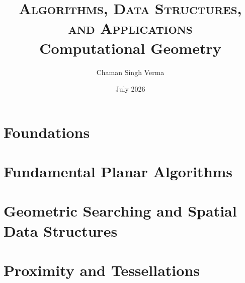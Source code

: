 \documentclass[11pt,a4paper,twoside]{book}
\title{%
  \textsc{Algorithms, Data Structures, and Applications}\\[6pt]
  \large Computational Geometry%
}
\author{%
  Chaman Singh Verma%
}
\date{July 2026}
\begin{document}
\frontmatter
\maketitle


\setcounter{tocdepth}{1}
\tableofcontents
\listofalgorithms
\listoffigures

\mainmatter

\part{Foundations}




\part{Fundamental Planar Algorithms}



\begingroup
\let\chapter\section

\endgroup


\part{Geometric Searching and Spatial Data Structures}



\begingroup
\let\chapter\section

\endgroup

\part{Proximity and Tessellations}



\end{document}
